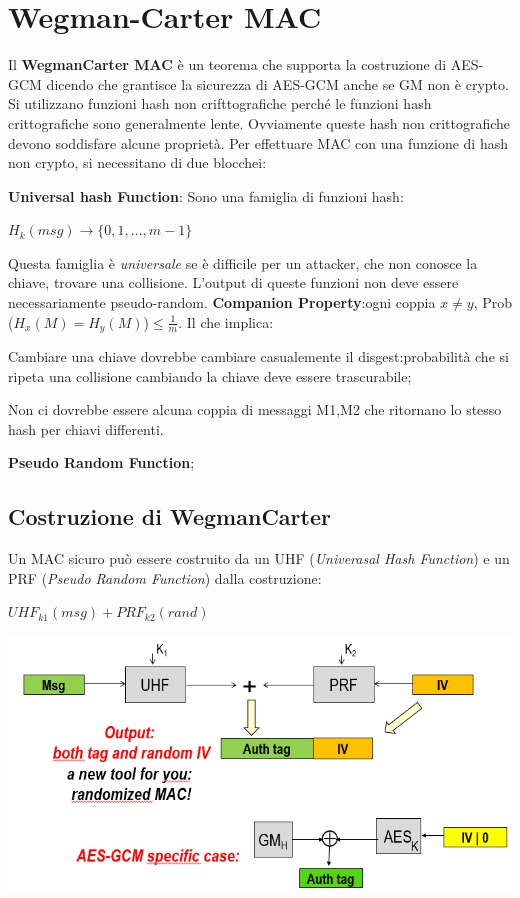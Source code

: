 \documentclass{book}
\theoremstyle{remark}
\begin{document}
\section{Wegman-Carter MAC}
Il \textbf{WegmanCarter MAC} è un teorema che supporta la costruzione di AES-GCM dicendo che grantisce la sicurezza di AES-GCM anche se GM non è crypto\@.
Si utilizzano funzioni hash non crifttografiche perché le funzioni hash crittografiche sono generalmente lente\@.\newline
Ovviamente queste hash non crittografiche devono soddisfare alcune proprietà\@. Per effettuare MAC con una funzione di hash non crypto, si necessitano di
due blocchei:
\begin{itemize}
	\item \textbf{Universal hash Function}:
	      Sono una famiglia di funzioni hash:
	      \begin{center}
		      \(H_k(msg)\rightarrow\{0,1,\dots,m-1\}\)
	      \end{center}
	      Questa famiglia è \emph{universale} se è difficile per un attacker, che
	      non conosce la chiave, trovare una collisione\@. L'output di queste funzioni non deve essere necessariamente pseudo-random\@.\newline
	      \textbf{Companion Property}:\@Per ogni coppia \(x\neq y\), Prob (\(H_x (M)=H_y (M)\))\(\leq \frac{1}{m}\)\@. Il che implica:
	      \begin{center}
		      \item Cambiare una chiave dovrebbe cambiare casualemente il disgest:\@la probabilità che si ripeta una collisione cambiando la chiave
		      deve essere trascurabile;\@
		      \item Non ci dovrebbe essere alcuna coppia di messaggi M1,M2 che ritornano lo stesso hash per chiavi differenti\@.
	      \end{center}
	\item \textbf{Pseudo Random Function};\@
\end{itemize}
\subsection{Costruzione di WegmanCarter}
Un MAC sicuro può essere costruito da un UHF (\emph{Univerasal Hash Function}) e un PRF (\emph{Pseudo Random Function}) dalla costruzione:
\begin{center}
	\(UHF_{k1}(msg)+PRF_{k2}(rand)\)
\end{center}
\begin{center}
	\includegraphics*[scale=0.8]{2021-11-21-22-43-47.png}
\end{center}
\end{document}
